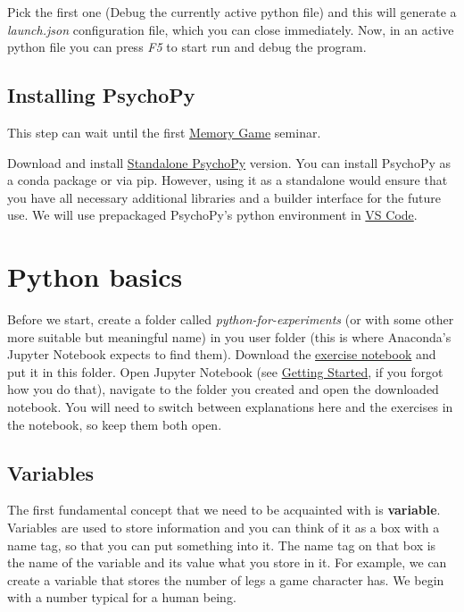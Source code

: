 \documentclass[
]{book}
\begin{document}
Pick the first one (Debug the currently active python file) and this will generate a \emph{launch.json} configuration file, which you can close immediately. Now, in an active python file you can press \emph{F5} to start run and debug the program.

\hypertarget{install-psychopy}{%
\section*{Installing PsychoPy}\label{install-psychopy}}

This step can wait until the first \protect\hyperlink{memory-game-01}{Memory Game} seminar.

Download and install \href{https://www.psychopy.org/download.html}{Standalone PsychoPy} version. You can install PsychoPy as a conda package or via pip. However, using it as a standalone would ensure that you have all necessary additional libraries and a builder interface for the future use. We will use prepackaged PsychoPy's python environment in \protect\hyperlink{install-vs-code}{VS Code}.

\hypertarget{seminar01}{%
\chapter{Python basics}\label{seminar01}}

Before we start, create a folder called \emph{python-for-experiments} (or with some other more suitable but meaningful name) in you user folder (this is where Anaconda's Jupyter Notebook expects to find them). Download the \href{notebooks/Seminar\%2001.\%20Basics.ipynb}{exercise notebook} and put it in this folder. Open Jupyter Notebook (see \protect\hyperlink{getting-started}{Getting Started}, if you forgot how you do that), navigate to the folder you created and open the downloaded notebook. You will need to switch between explanations here and the exercises in the notebook, so keep them both open.

\hypertarget{variables}{%
\section{Variables}\label{variables}}

The first fundamental concept that we need to be acquainted with is \textbf{variable}. Variables are used to store information and you can think of it as a box with a name tag, so that you can put something into it. The name tag on that box is the name of the variable and its value what you store in it. For example, we can create a variable that stores the number of legs a game character has. We begin with a number typical for a human being.
\end{document}
